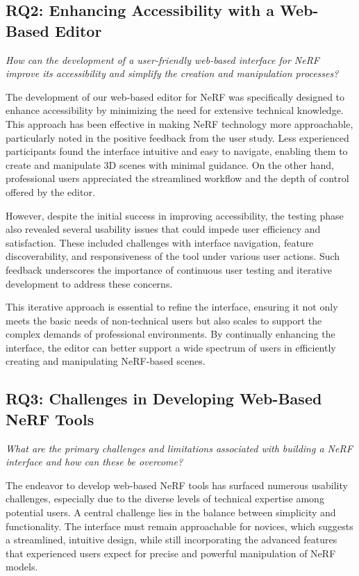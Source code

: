 \subsection*{RQ2: Enhancing Accessibility with a Web-Based Editor}

\emph{How can the development of a user-friendly web-based interface for NeRF improve its accessibility and simplify the creation and manipulation processes?}

The development of our web-based editor for NeRF was specifically designed to enhance accessibility by minimizing the need for extensive technical knowledge.
This approach has been effective in making NeRF technology more approachable, particularly noted in the positive feedback from the user study.
Less experienced participants found the interface intuitive and easy to navigate, enabling them to create and manipulate 3D scenes with minimal guidance.
On the other hand, professional users appreciated the streamlined workflow and the depth of control offered by the editor.

However, despite the initial success in improving accessibility, the testing phase also revealed several usability issues that could impede user efficiency and satisfaction.
These included challenges with interface navigation, feature discoverability, and responsiveness of the tool under various user actions.
Such feedback underscores the importance of continuous user testing and iterative development to address these concerns. 

This iterative approach is essential to refine the interface, ensuring it not only meets the basic needs of non-technical users but also scales to support the complex demands of professional environments.
By continually enhancing the interface, the editor can better support a wide spectrum of users in efficiently creating and manipulating NeRF-based scenes.

\subsection*{RQ3: Challenges in Developing Web-Based NeRF Tools}

\emph{What are the primary challenges and limitations associated with building a NeRF interface and how can these be overcome?}

The endeavor to develop web-based NeRF tools has surfaced numerous usability challenges, especially due to the diverse levels of technical expertise among potential users.
A central challenge lies in the balance between simplicity and functionality.
The interface must remain approachable for novices, which suggests a streamlined, intuitive design, while still incorporating the advanced features that experienced users expect for precise and powerful manipulation of NeRF models.

